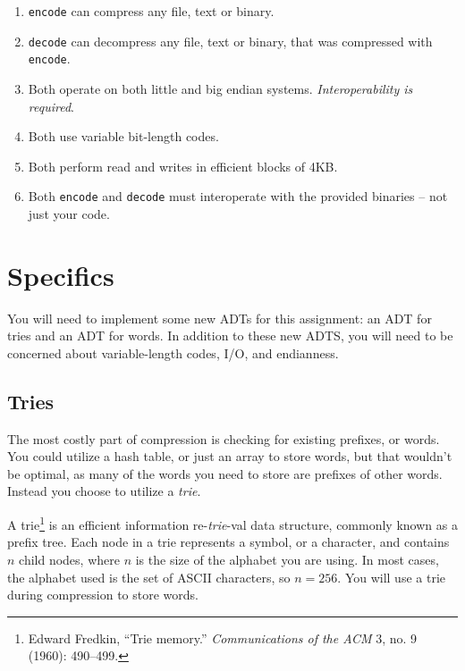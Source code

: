 \documentclass{article}
\begin{document}
\begin{enumerate}
    \item \texttt{encode} can compress any file, text or binary.

    \item \texttt{decode} can decompress any file, text or binary, that was
        compressed with \texttt{encode}.

    \item Both operate on both little and big endian systems.
        \emph{Interoperability is required}.

    \item Both use variable bit-length codes.

    \item Both perform read and writes in efficient blocks of 4KB.

    \item Both \texttt{encode} and \texttt{decode} must interoperate
        with the provided binaries -- not just your code.
\end{enumerate}

\section{Specifics}

You will need to implement some new ADTs for this assignment: an ADT for tries
and an ADT for words. In addition to these new ADTS, you will need to
be concerned about variable-length codes, I/O, and endianness.

\subsection{Tries}
The most costly part of compression is checking for existing prefixes, or words.
You could utilize a hash table, or just an array to store words, but that
wouldn't be optimal, as many of the words you need to store are prefixes of
other words. Instead you choose to utilize a \emph{trie}.

A trie\footnote{Edward Fredkin, ``{T}rie memory.'' \emph{Communications of the
ACM} 3, no. 9 (1960): 490--499.} is an efficient information re-\emph{trie}-val
data structure, commonly known as a prefix tree. Each node in a trie represents
a symbol, or a character, and contains $n$ child nodes, where $n$ is the size of
the alphabet you are using. In most cases, the alphabet used is the set of ASCII
characters, so $n = 256$. You will use a trie during compression to store words.
\end{document}
